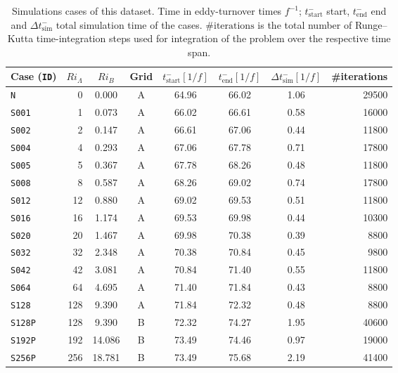 \documentclass[11pt]{article}
\begin{document}
\begin{table}[H]
    \centering
    \begin{tabular}{lrcccccr}
        Case (\texttt{ID}) & $Ri_\Lambda$ & $Ri_B$ & Grid &  $t^-_\text{start} [1/f]$ &  $t^-_\text{end} [1/f]$ &  $\Delta t^-_\text{sim} [1/f]$ &  \#iterations \\ \bottomrule
        \texttt{N    } &   0 & \hphantom{1}0.000 & A & 64.96 & 66.02 & 1.06 & 29500  \\ [1ex]
        \texttt{S001 } &   1 & \hphantom{1}0.073 & A & 66.02 & 66.61 & 0.58 & 16000  \\
        \texttt{S002 } &   2 & \hphantom{1}0.147 & A & 66.61 & 67.06 & 0.44 & 11800  \\
        \texttt{S004 } &   4 & \hphantom{1}0.293 & A & 67.06 & 67.78 & 0.71 & 17800  \\
        \texttt{S005 } &   5 & \hphantom{1}0.367 & A & 67.78 & 68.26 & 0.48 & 11800  \\
        \texttt{S008 } &   8 & \hphantom{1}0.587 & A & 68.26 & 69.02 & 0.74 & 17800  \\
        \texttt{S012 } &  12 & \hphantom{1}0.880 & A & 69.02 & 69.53 & 0.51 & 11800  \\
        \texttt{S016 } &  16 & \hphantom{1}1.174 & A & 69.53 & 69.98 & 0.44 & 10300  \\
        \texttt{S020 } &  20 & \hphantom{1}1.467 & A & 69.98 & 70.38 & 0.39 & 8800  \\
        \texttt{S032 } &  32 & \hphantom{1}2.348 & A & 70.38 & 70.84 & 0.45 & 9800  \\
        \texttt{S042 } &  42 & \hphantom{1}3.081 & A & 70.84 & 71.40 & 0.55 & 11800  \\
        \texttt{S064 } &  64 & \hphantom{1}4.695 & A & 71.40 & 71.84 & 0.43 & 8800  \\ 
        \texttt{S128 } & 128 & \hphantom{1}9.390 & A & 71.84 & 72.32 & 0.48 & 8800  \\ [1ex] 
        \texttt{S128P} & 128 & \hphantom{1}9.390 & B & 72.32 & 74.27 & 1.95 & 40600  \\
        \texttt{S192P} & 192 & 14.086            & B & 73.49 & 74.46 & 0.97 & 19000  \\
        \texttt{S256P} & 256 & 18.781            & B & 73.49 & 75.68 & 2.19 & 41400  \\
    \end{tabular}
    \caption{Simulations cases of this dataset. Time in eddy-turnover times $f^{-1}$; $t^-_\text{start}$ start, $t^-_\text{end}$ end and $\Delta t^-_\text{sim}$ total simulation time of the cases. $\#\text{iterations}$ is the total number of Runge--Kutta time-integration steps used for integration of the problem over the respective time span.}
    \label{tab:cases}
\end{table} 
\end{document}

